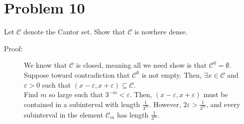 \documentclass[8pt]{extarticle}
\begin{document}
  \section{Problem 10}%
  Let $\mathcal{C}$ denote the Cantor set. Show that $\mathcal{C}$ is nowhere dense.
  \begin{description}
    \item[Proof:] We know that $\mathcal{C}$ is closed, meaning all we need show is that $\mathcal{C}^{0} = \emptyset$.\\

      Suppose toward contradiction that $\mathcal{C}^{0}$ is not empty. Then, $\exists x\in \mathcal{C}$ and $\varepsilon > 0$ such that $(x-\varepsilon, x+\varepsilon) \subseteq \mathcal{C}$.\\

      Find $m$ so large such that $3^{-m} < \varepsilon$. Then, $(x-\varepsilon, x + \varepsilon)$ must be contained in a subinterval with length $\frac{1}{3^m}$. However, $2\varepsilon > \frac{1}{3^m}$, and every subinterval in the element $\mathcal{C}_m$ has length $\frac{1}{3^m}$.
  \end{description}
\end{document}
